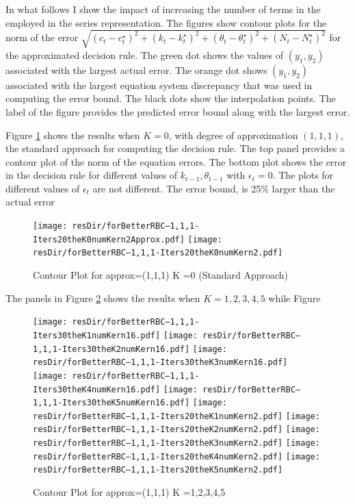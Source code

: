 \documentclass[12pt]{article}
\begin{document}
In what follows I show the impact of increasing the number of terms in the 
employed in the series representation.  
The figures  show contour plots for the norm of the error 
$\sqrt{(c_t-c_t^\star)^2 +(k_t-k_t^\star)^2 +(\theta_t-\theta_t^\star)^2 +(N_t-N_t^\star)^2 }$ for the approximated decision rule. The green dot shows the values of $(y_1,y_2)$ associated with the largest actual error.  The orange dot shows $(y_1,y_2)$ associated with  the largest equation system discrepancy 
that was used in computing the error bound. The black dots show the interpolation points. The label of the figure provides the predicted error bound along with the largest error.


Figure \ref{fig:cntpltA} shows the results when $K=0$, with degree of approximation $(1,1,1)$, the standard approach
for computing the decision rule.  The top panel provides a contour plot of the
norm of the equation errors. The bottom plot shows the error in the decision rule for different values of $k_{t-1}, \theta_{t-1}$ with $\epsilon_t=0$.  The plots for different values of $\epsilon_t$ are not different. The error bound,  is 25\% larger than the actual error 

\begin{figure}
  \centering
\ifmacosx
  \texttt{[image: resDir/forBetterRBC--1,1,1-Iters20theK0numKern2Approx.pdf]}
  \texttt{[image: resDir/forBetterRBC--1,1,1-Iters20theK0numKern2.pdf]}
\fi
  \caption{Contour Plot for approx=(1,1,1) K =0 (Standard Approach)}
  \label{fig:cntpltA}
\end{figure}

The panels in Figure \ref{fig:cntpltB} shows the results when $K=1,2,3,4,5$
while Figure



\begin{figure}
  \centering
\iflinux
\texttt{[image: resDir/forBetterRBC--1,1,1-Iters30theK1numKern16.pdf]}
\texttt{[image: resDir/forBetterRBC--1,1,1-Iters30theK2numKern16.pdf]}
\texttt{[image: resDir/forBetterRBC--1,1,1-Iters30theK3numKern16.pdf]}
\texttt{[image: resDir/forBetterRBC--1,1,1-Iters30theK4numKern16.pdf]}
\texttt{[image: resDir/forBetterRBC--1,1,1-Iters30theK5numKern16.pdf]}
\fi
\ifmacosx
\texttt{[image: resDir/forBetterRBC--1,1,1-Iters20theK1numKern2.pdf]}
\texttt{[image: resDir/forBetterRBC--1,1,1-Iters20theK2numKern2.pdf]}
\texttt{[image: resDir/forBetterRBC--1,1,1-Iters20theK3numKern2.pdf]}
\texttt{[image: resDir/forBetterRBC--1,1,1-Iters20theK4numKern2.pdf]}
\texttt{[image: resDir/forBetterRBC--1,1,1-Iters20theK5numKern2.pdf]}
\fi
  \caption{Contour Plot for approx=(1,1,1)  K =1,2,3,4,5}
  \label{fig:cntpltB}
\end{figure}
\end{document}
